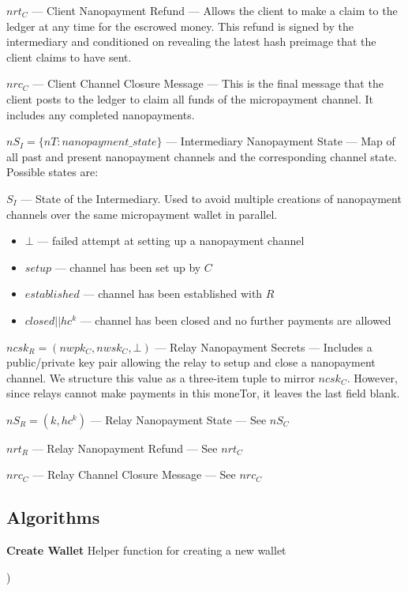 $nrt_C$ --- Client Nanopayment Refund --- Allows the client to make a claim to the ledger at any time for the escrowed money.
This refund is signed by the intermediary and conditioned on revealing the latest hash preimage that the client claims to have sent.

$nrc_C$ --- Client Channel Closure Message --- This is the final message that the client posts to the ledger to claim all funds of the micropayment channel.
It includes any completed nanopayments.

$nS_I = \{nT: nanopayment\_state\}$ --- Intermediary Nanopayment State --- Map of all past and present nanopayment channels and the corresponding channel state.
Possible states are:

$S_I$ --- State of the Intermediary.
Used to avoid multiple creations of nanopayment channels over the same micropayment wallet in parallel.

\begin{itemize}
\item $\bot$ --- failed attempt at setting up a nanopayment channel
\item $setup$ --- channel has been set up by $C$
\item $established$ --- channel has been established with $R$
\item $closed||hc^k$ --- channel has been closed and no further payments
  are allowed
\end{itemize}

$ncsk_R = (nwpk_C, nwsk_C, \bot)$ --- Relay Nanopayment Secrets --- Includes a public/private key pair allowing the relay to setup and close a nanopayment channel.
We structure this value as a three-item tuple to mirror $ncsk_C$.
However, since relays cannot make payments in this moneTor, it leaves the last field blank.

$nS_R = (k, hc^k)$ --- Relay Nanopayment State --- See $nS_C$

$nrt_R$ --- Relay Nanopayment Refund --- See $nrt_C$

$nrc_C$ --- Relay Channel Closure Message --- See $nrc_C$

\subsection{Algorithms}
\begin{algorithm}
  \caption[Create Wallet]{\textbf{Create Wallet} Helper function for creating a new wallet}
  \begin{algorithmic}[1]
    )
    \EndFunction{}
  \end{algorithmic}
\end{algorithm}

